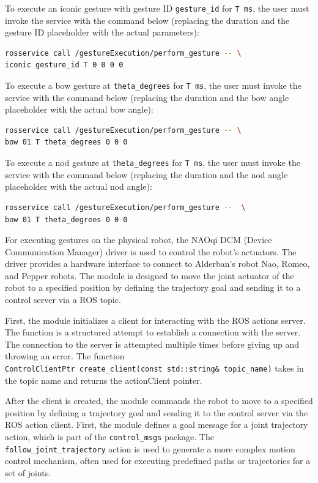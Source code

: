 \documentclass{CSSRforAfrica}
\begin{document}
 To execute an iconic gesture with gesture ID  \texttt{gesture\_id} for \texttt{T ms}, the user must invoke the service with the command below (replacing the duration and the gesture ID placeholder with the actual parameters):

\begin{lstlisting}[style=withoutNumbering, language=bash]
rosservice call /gestureExecution/perform_gesture -- \
iconic gesture_id T 0 0 0 0
\end{lstlisting}

 To execute a bow gesture at  \texttt{theta\_degrees} for \texttt{T ms}, the user must invoke the service with the command below (replacing the duration and the bow angle placeholder with the actual bow angle):

\begin{lstlisting}[style=withoutNumbering, language=bash]
rosservice call /gestureExecution/perform_gesture -- \
bow 01 T theta_degrees 0 0 0
\end{lstlisting}

To execute a nod gesture at  \texttt{theta\_degrees} for \texttt{T ms}, the user must invoke the service with the command below (replacing the duration and the nod angle placeholder with the actual nod angle):

\begin{lstlisting}[style=withoutNumbering, language=bash]
rosservice call /gestureExecution/perform_gesture --  \
bow 01 T theta_degrees 0 0 0
\end{lstlisting}


For executing gestures on the physical robot, the NAOqi DCM (Device Communication Manager) driver is used to control the robot's actuators. 
The driver provides a hardware interface to connect to Alderban's robot Nao, Romeo, and Pepper robots. The module is designed to move the joint actuator of the robot to a specified position by defining the trajectory goal and sending it to a control server via a ROS topic. 

First, the module initializes a client for interacting with the ROS actions server. The function is a structured attempt to establish a connection with the server. The connection to the server is attempted multiple times before giving up and throwing an error. The function \\ {\footnotesize \texttt{ControlClientPtr 
create\_client(const std::string\& topic\_name)}} takes in the topic name and returns the actionClient pointer. 

After the client is created, the module commands the robot to move to a specified position by defining a trajectory
goal and sending it to the control server via the ROS action client. First, the module defines a goal message for 
a joint trajectory action, which is part of the \texttt{control\_msgs} package. The \texttt{follow\_joint\_trajectory}
action is used to generate a more complex motion control mechanism, often used for executing predefined paths or
trajectories for a set of joints. 
\end{document}
